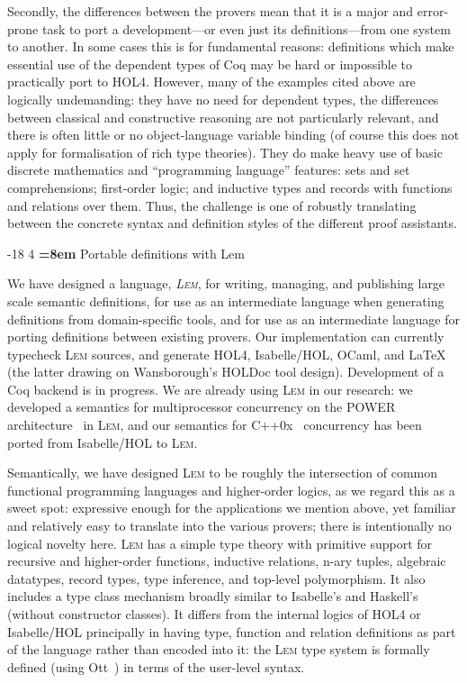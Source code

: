 \documentclass[a4paper]{llncs}
\makeatletter
\renewcommand{\section}{\vspace*{-2mm}\@startsection{section}{1}{\z@}%
                       {-18\p@ \@plus -4\p@ \@minus -4\p@}%
                       {4\p@ \@plus 2\p@ \@minus 2\p@}%
                       {\normalfont\large\bfseries\boldmath
                        \rightskip=\z@ \@plus 8em\pretolerance=10000 }}
\newcommand{\toolname}{\textsc{Lem}}
\newcommand{\toolnamesect}{Lem}
\makeatother
\begin{document}
Secondly, the differences between the provers mean that it is a major
and error-prone task to port a development---or even just its
definitions---from one system to another.  In some cases this is for
fundamental reasons:   definitions which make essential use
of the dependent types of Coq may be hard or impossible to practically
port to HOL4.  However, many of the examples cited above are 
logically undemanding: they have no need for dependent types, the
differences between classical and constructive reasoning are not
particularly relevant, and there is often little or no object-language
variable binding (of course this does not apply for formalisation of
rich type theories).   They do make heavy use of basic discrete mathematics and
``programming language'' features: sets and set comprehensions;
first-order logic; and inductive types and records with functions and
relations over them.  Thus, the challenge is one of robustly
translating between the concrete syntax and definition styles of the
different proof assistants. 

\section{Portable definitions with \toolnamesect{}}

We have designed a language, \emph{\toolname{}}, for writing,
managing, and publishing large scale semantic definitions, 
for use as an intermediate language when generating definitions
from domain-specific tools, and for use as an
intermediate language for porting definitions between existing provers.
%
  Our
implementation can currently typecheck \toolname{} sources, and
generate HOL4, Isabelle/HOL, OCaml, and \LaTeX{} (the latter drawing
on Wansborough's HOLDoc tool design).
Development of a Coq backend is in progress.  We are already
using \toolname{} in our research: we developed a semantics for
multiprocessor concurrency on the POWER architecture~\cite{pldi11} in \toolname{}, and our semantics
for C++0x~\cite{C++,ppdp11} concurrency has been ported from Isabelle/HOL to \toolname{}.

Semantically, we have designed \toolname{} to be 
roughly the intersection of
common functional programming languages and higher-order logics,
as we regard this as a sweet spot: expressive enough for the
applications we mention above, yet familiar and relatively easy to translate 
into the various provers; there is intentionally no logical novelty here. 
%
\toolname{} 
has a simple
type theory 
with primitive support for recursive and
higher-order functions, inductive relations, n-ary tuples, algebraic
datatypes, record types, type inference, and top-level polymorphism.  
It also includes a type class mechanism
broadly similar to Isabelle's and Haskell's 
(without
constructor classes).  It differs from the internal logics of HOL4 or
Isabelle/HOL principally in having type, function and relation
definitions as part of the language rather than encoded into it:
the \toolname{} type system is formally defined (using Ott~\cite{ott}) in terms of
the user-level syntax. 
\end{document}
